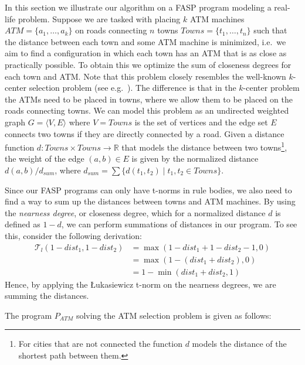 \documentclass{tlp}
\newcommand{\pretnorm}{\mathcal{T}}
\newcommand{\tuple}[1]{\ensuremath{\langle{#1}\rangle}}
\begin{document}
In this section we illustrate our algorithm on a FASP program modeling a real-life problem. Suppose we are tasked with placing $k$ ATM machines $\mathit{ATM} = \{ a_1,\ldots,a_k \}$ on roads connecting $n$ towns $Towns = \{ t_1,\ldots,t_n \}$ such that the distance between each town and some ATM machine is minimized, i.e.~we aim to find a configuration in which each town has an ATM that is as close as practically possible. To obtain this we optimize the sum of closeness degrees for each town and ATM. Note that this problem closely resembles the well-known $k$-center selection problem (see e.g.~\cite{AusielloAl:ComplexityAndApproximation}). The difference is that in the $k$-center problem the ATMs need to be placed in towns, where we allow them to be placed on the roads connecting towns. We can model this problem as an undirected weighted graph $G = \tuple{V,E}$ where $V = Towns$ is the set of vertices and the edge set $E$ connects two towns if they are directly connected by a road. Given a distance function $d : Towns \times Towns \to \mathbb{R}$ that models the distance between two towns\footnote{For cities that are not connected the function $d$ models the distance of the shortest path between them.}, the weight of the edge $(a,b) \in E$ is given by the normalized distance $d(a,b)/d_{sum}$, where $d_{sum} = \sum\{ d(t_1,t_2) \mid t_1,t_2 \in Towns\}$.

Since our FASP programs can only have t-norms in rule bodies, we also need to find a way to sum up the distances between towns and ATM machines. By using the \emph{nearness degree}, or closeness degree, which for a normalized distance $d$ is defined as $1-d$, we can perform summations of distances in our program. To see this, consider the following derivation:
 \begin{align*}
  \pretnorm_l(1-dist_1,1-dist_2)
    & = \max(1-dist_1 + 1-dist_2-1,0)\\
    & = \max(1-(dist_1 + dist_2),0)\\
    & = 1-\min(dist_1 + dist_2,1) 
 \end{align*}
Hence, by applying the \L ukasiewicz t-norm on the nearness degrees, we are summing the distances.

The program $P_{\mathit{ATM}}$ solving the ATM selection problem is given as follows:
\end{document}

